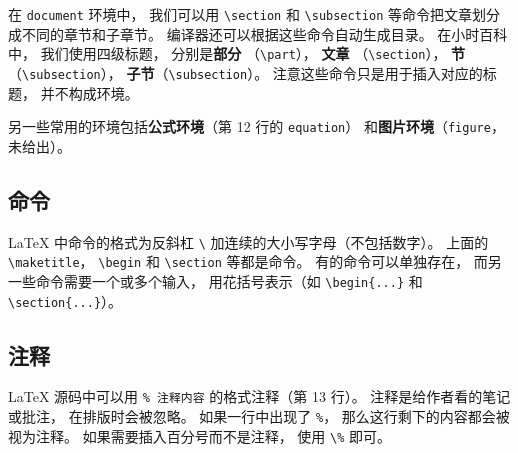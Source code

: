 在 \verb|document| 环境中， 我们可以用 \verb|\section| 和 \verb|\subsection| 等命令把文章划分成不同的章节和子章节。 编译器还可以根据这些命令自动生成目录。 在小时百科中， 我们使用四级标题， 分别是\textbf{部分} （\verb|\part|）， \textbf{文章} （\verb|\section|）， \textbf{节}（\verb|\subsection|）， \textbf{子节}（\verb|\subsection|）。 注意这些命令只是用于插入对应的标题， 并不构成环境。

另一些常用的环境包括\textbf{公式环境}（第 12 行的 \verb|equation|） 和\textbf{图片环境}（\verb|figure|， 未给出）。

\subsection{命令}
LaTeX 中命令的格式为反斜杠 \verb|\| 加连续的大小写字母（不包括数字）。 上面的 \verb|\maketitle|， \verb|\begin| 和 \verb|\section| 等都是命令。 有的命令可以单独存在， 而另一些命令需要一个或多个输入， 用花括号表示（如 \verb|\begin{...}| 和 \verb|\section{...}|）。

\subsection{注释}
LaTeX 源码中可以用 \verb|% 注释内容| 的格式注释（第 13 行）。 注释是给作者看的笔记或批注， 在排版时会被忽略。 如果一行中出现了 \verb|%|， 那么这行剩下的内容都会被视为注释。 如果需要插入百分号而不是注释， 使用 \verb|\%| 即可。

